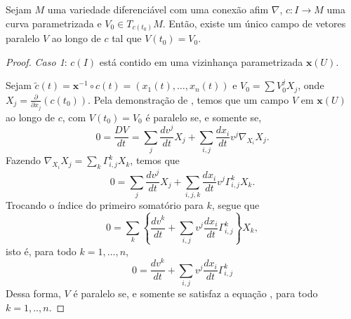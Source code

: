 \begin{proposition}
	\label{prop:transporte-paralelo}
	Sejam $M$ uma variedade diferenciável com uma conexão afim $\nabla$, $c:I\to M$ uma curva parametrizada e $V_{0} \in T_{c(t_{0})}M$. Então, existe um único campo de vetores paralelo $V$ ao longo de $c$ tal que $V(t_{0})=V_{0}$.
	\begin{proof}

		\emph{Caso 1}: $c(I)$ está contido em uma vizinhança parametrizada $\mathbf{x}(U)$.

		Sejam $\tilde{c}(t)=\mathbf{x}^{-1} \circ c(t) = (x_{1}(t), \dots, x_{n}(t))$ e $V_{0}=\sum V_{0}^{j}X_{j}$, onde $X_{j}=\frac{\partial}{\partial x_{j}}(c(t_{0}))$.
		Pela demonstração de , temos que um campo $V$ em $\mathbf{x}(U)$ ao longo de $c$, com $V(t_{0})=V_{0}$ é paralelo se, e somente se,
		\begin{equation*}
			0=\frac{DV}{dt}=\sum_{j}\frac{dv^{j}}{dt}X_{j}+\sum_{i,j}\frac{dx_{i}}{dt}v^{j}\nabla_{X_{i}}X_{j}.
		\end{equation*}
		Fazendo $\nabla_{X_{i}}X_{j}=\sum_{k}\Gamma_{i,j}^{k}X_{k}$, temos que
		\begin{equation*}
			0=\sum_{j}\frac{dv^{j}}{dt}X_{j}+\sum_{i,j,k}\frac{dx_{i}}{dt}v^{j}\Gamma_{i,j}^{k}X_{k}.
		\end{equation*}
		Trocando o índice do primeiro somatório para $k$, segue que
		\begin{equation*}
			0=\sum_{k}\left\{  \frac{dv^{k}}{dt}+\sum_{i,j}v^{j}\frac{dx_{i}}{dt}\Gamma_{i,j}^{k}  \right\}X_{k},
		\end{equation*}
		isto é, para todo $k=1, \dots, n$,
		\begin{equation}
			\label{eq:covariant}
			0=\frac{dv^{k}}{dt}+\sum_{i,j}v^{j}\frac{dx_{i}}{dt}\Gamma_{i,j}^{k}
		\end{equation}
		Dessa forma, $V$ é paralelo se, e somente se satisfaz a equação , para todo $k=1, .., n$.


\end{proof}
\end{proposition}

